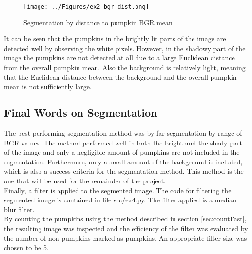 \documentclass[../Head/Main.tex]{subfiles}
\begin{document}
\begin{figure}[H]
\centering
\texttt{[image: ../Figures/ex2\_bgr\_dist.png]}
\caption{Segmentation by distance to pumpkin BGR mean}
\label{fig:bgrDist}
\end{figure}

It can be seen that the pumpkins in the brightly lit parts of the image are detected well by observing the white pixels. However, in the shadowy part of the image the pumpkins are not detected at all due to a large Euclidean distance from the overall pumpkin mean. Also the background is relatively light, meaning that the Euclidean distance between the background and the overall pumpkin mean is not sufficiently large.

\subsection{Final Words on Segmentation}
The best performing segmentation method was by far segmentation by range of BGR values. The method performed well in both the bright and the shady part of the image and only a negligible amount of pumpkins are not included in the segmentation. Furthermore, only a small amount of the background is included, which is also a success criteria for the segmentation method. This method is the one that will be used for the remainder of the project.\\
Finally, a filter is applied to the segmented image. The code for filtering the segmented image is contained in file \url{src/ex4.py}. The filter applied is a median blur filter.\\
By counting the pumpkins using the method described in section \ref{sec:countFast}, the resulting image was inspected and the efficiency of the filter was evaluated by the number of non pumpkins marked as pumpkins. An appropriate filter size was chosen to be 5.
\end{document}
